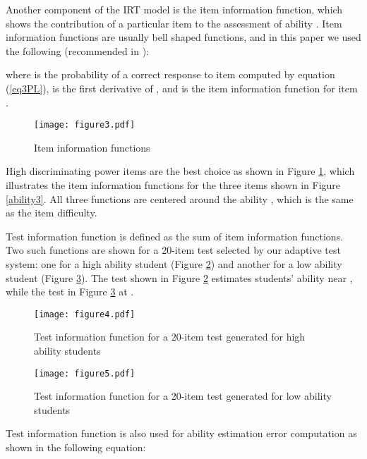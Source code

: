 \documentclass[11pt,twoside]{article}
\begin{document}
Another component of the IRT model is the item information function, which shows the contribution of a particular item to the assessment of ability \cite{HAMBLETON}. Item information functions are usually bell shaped functions, and in this paper we used  the following (recommended in \cite{RUDNER}): 

where  is the probability of a correct response to item  computed by equation (\ref{eq3PL}),  is the first derivative of , and  is the item information function for item .

\begin{figure}[t]
\begin{center}\texttt{[image: figure3.pdf]}\end{center}
\caption{\label{iteminfo3}Item information functions} 
\end{figure}


High discriminating power items are the best choice  as shown in  Figure \ref{iteminfo3}, which illustrates the item information functions for the three items shown in Figure \ref{ability3}. All three functions are centered around the ability , which is the same as the item difficulty.

Test information function  is defined as the sum of item information functions. Two such functions are shown for a 20-item test selected by our adaptive test system: one for a high ability student (Figure \ref{fig:smart})  and another for a low ability student (Figure \ref{fig:dull}). The test shown in Figure \ref{fig:smart} estimates students' ability near , while the test in Figure \ref{fig:dull} at .


\begin{figure}
\begin{center}\texttt{[image: figure4.pdf]} \end{center}          
\caption{\label{fig:smart}Test information function for a 20-item test generated for  high ability students} 
\end{figure}

\begin{figure}
\begin{center}    \texttt{[image: figure5.pdf]} \end{center}
\caption{\label{fig:dull} Test information function for a 20-item test generated for low ability students} 
\end{figure}


Test information function is also used for ability estimation error computation as shown in the following equation:
\end{document}
